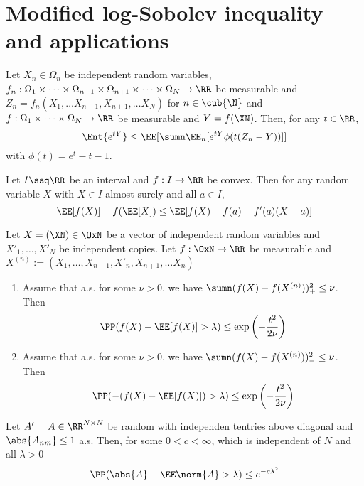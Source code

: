 \section{Modified log-Sobolev inequality and applications}

\begin{thm}
Let $X_n\in \Omega_n$ be independent random variables, $f_n: \Omega_1\times \dots \times \Omega_{n-1} \times \Omega_{n+1} \times \dots \times \Omega_N \to \RR$ be measurable and $Z_n = f_n(X_1,\dots X_{n-1}, X_{n+1}, \dots X_N)$ for $n \in \cub{\N}$ and $f:\Omega_1 \times \dots \times \Omega_N\to \RR$ be measurable and $Y= f(\XN)$. Then, for any $t\in \RR$,
$$\Ent{e^{tY}} \leq \EE[\sumn \EE_n[e^{tY} \phi(t(Z_n-Y))]]$$
with $\phi(t)=e^{t}-t-1$.
\end{thm}


\begin{thm}
    Let $I\ssq \RR$ be an interval and $f: I \to \RR$ be convex. Then for any random variable $X$ with $X\in I$ almost surely and all $a\in I$, 
    $$\EE[f(X)]-f(\EE[X]) \leq \EE[f(X)-f(a)-f'(a)(X-a)]$$
\end{thm}


\begin{thm}
    Let $X=(\XN) \in \OxN$ be a vector of independent random variables and $X'_1, \dots, X'_N$ be independent copies. Let $f: \OxN \to \RR$ be measurable and $X^{(n)}:= (X_1, \dots, X_{n-1}, X'_n, X_{n+1}, \dots X_n)$
    \begin{enumerate}
        \item Assume that a.s. for some $\nu>0$, we have $\sumn (f(X)-f(X^{(n)}))_+^2 \leq \nu$. Then 
        $$\PP(f(X)- \EE[f(X)] > \lambda) \leq \exp\left(- \frac{t^2}{2 \nu}\right)$$
        \item Assume that a.s. for some $\nu>0$, we have $\sumn (f(X)-f(X^{(n)}))_-^2 \leq \nu$. Then 
        $$\PP(-(f(X)- \EE[f(X)]) > \lambda) \leq \exp\left(- \frac{t^2}{2 \nu}\right)$$
    \end{enumerate}
\end{thm}

\begin{thm}[Talagrand]
    Let $A'=A\in \RR^{N\times N}$ be random with independen tentries above diagonal and $\abs{A_{nm}}\leq 1$ a.s. Then, for some $0<c<\infty$, which is independent of $N$ and all $\lambda>0$
    $$\PP(\abs{A}- \EE\norm{A} > \lambda) \leq e^{-c\lambda^2}$$
\end{thm}